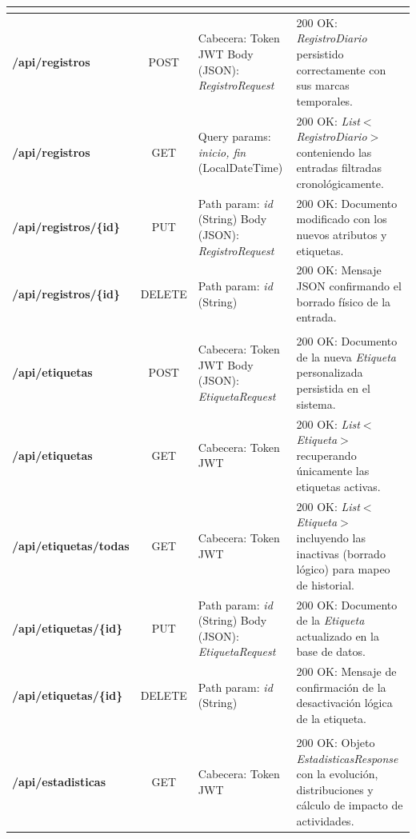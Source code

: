 {\begin{xltabular}{\textwidth}{|>{\bfseries}l|c|X|X|}
         \\ \hline
        /api/registros & POST & Cabecera: Token JWT \newline Body (JSON): \textit{RegistroRequest} & 200 OK: \textit{RegistroDiario} persistido correctamente con sus marcas temporales. \\ \hline
        /api/registros & GET & Query params: \textit{inicio, fin} (LocalDateTime) & 200 OK: \textit{List$<$RegistroDiario$>$} conteniendo las entradas filtradas cronológicamente. \\ \hline
        /api/registros/\{id\} & PUT & Path param: \textit{id} (String) \newline Body (JSON): \textit{RegistroRequest} & 200 OK: Documento modificado con los nuevos atributos y etiquetas. \\ \hline
        /api/registros/\{id\} & DELETE & Path param: \textit{id} (String) & 200 OK: Mensaje JSON confirmando el borrado físico de la entrada. \\ \hline

         \\ \hline
        /api/etiquetas & POST & Cabecera: Token JWT \newline Body (JSON): \textit{EtiquetaRequest} & 200 OK: Documento de la nueva \textit{Etiqueta} personalizada persistida en el sistema. \\ \hline
        /api/etiquetas & GET & Cabecera: Token JWT & 200 OK: \textit{List$<$Etiqueta$>$} recuperando únicamente las etiquetas activas. \\ \hline
        /api/etiquetas/todas & GET & Cabecera: Token JWT & 200 OK: \textit{List$<$Etiqueta$>$} incluyendo las inactivas (borrado lógico) para mapeo de historial. \\ \hline
        /api/etiquetas/\{id\} & PUT & Path param: \textit{id} (String) \newline Body (JSON): \textit{EtiquetaRequest} & 200 OK: Documento de la \textit{Etiqueta} actualizado en la base de datos. \\ \hline
        /api/etiquetas/\{id\} & DELETE & Path param: \textit{id} (String) & 200 OK: Mensaje de confirmación de la desactivación lógica de la etiqueta. \\ \hline

         \\ \hline
        /api/estadisticas & GET & Cabecera: Token JWT & 200 OK: Objeto \textit{EstadisticasResponse} con la evolución, distribuciones y cálculo de impacto de actividades. \\ \hline


\end{xltabular}}
